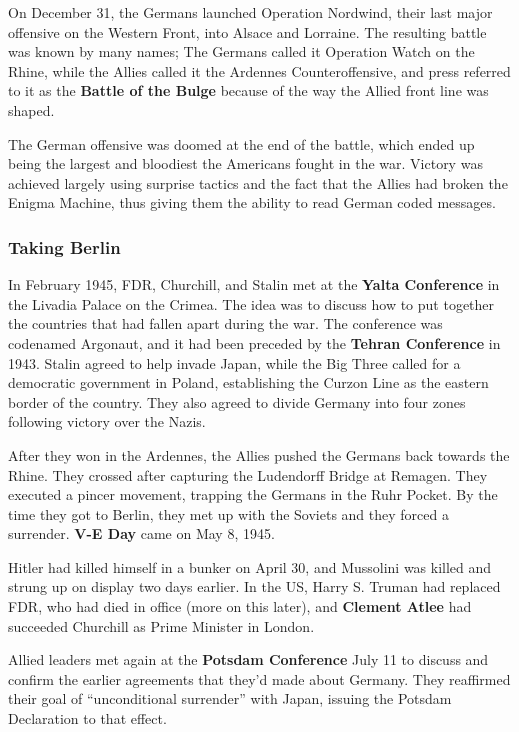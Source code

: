 On December 31, the Germans launched Operation Nordwind, their last major offensive on the Western Front,
into Alsace and Lorraine.
The resulting battle was known by many names;
The Germans called it Operation Watch on the Rhine,
while the Allies called it the Ardennes Counteroffensive,
and press referred to it as the \textbf{Battle of the Bulge} because of the way the Allied front line was shaped.

The German offensive was doomed at the end of the battle,
which ended up being the largest and bloodiest the Americans fought in the war.
Victory was achieved largely using surprise tactics and the fact that the Allies had broken the Enigma Machine,
thus giving them the ability to read German coded messages.

\subsubsection*{Taking Berlin}

In February 1945, FDR, Churchill, and Stalin met at the \textbf{Yalta Conference} in the Livadia Palace on the Crimea.
The idea was to discuss how to put together the countries that had fallen apart during the war.
The conference was codenamed Argonaut, and it had been preceded by the \textbf{Tehran Conference} in 1943.
Stalin agreed to help invade Japan,
while the Big Three called for a democratic government in Poland,
establishing the Curzon Line as the eastern border of the country.
They also agreed to divide Germany into four zones following victory over the Nazis.

After they won in the Ardennes, the Allies pushed the Germans back towards the Rhine.
They crossed after capturing the Ludendorff Bridge at Remagen.
They executed a pincer movement, trapping the Germans in the Ruhr Pocket.
By the time they got to Berlin, they met up with the Soviets and they forced a surrender.
\textbf{V-E Day} came on May 8, 1945.

Hitler had killed himself in a bunker on April 30,
and Mussolini was killed and strung up on display two days earlier.
In the US, Harry S. Truman had replaced FDR, who had died in office (more on this later),
and \textbf{Clement Atlee} had succeeded Churchill as Prime Minister in London.

Allied leaders met again at the \textbf{Potsdam Conference} July 11
to discuss and confirm the earlier agreements that they'd made about Germany.
They reaffirmed their goal of ``unconditional surrender'' with Japan,
issuing the Potsdam Declaration to that effect.

